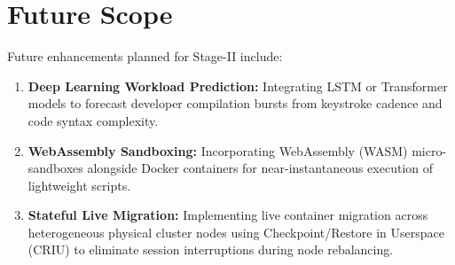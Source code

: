 \documentclass[12pt,a4paper]{report}
\begin{document}
	\section{Future Scope}
	Future enhancements planned for Stage-II include:
	\begin{enumerate}
		\item \textbf{Deep Learning Workload Prediction:} Integrating LSTM or Transformer models to forecast developer compilation bursts from keystroke cadence and code syntax complexity.
		\item \textbf{WebAssembly Sandboxing:} Incorporating WebAssembly (WASM) micro-sandboxes alongside Docker containers for near-instantaneous execution of lightweight scripts.
		\item \textbf{Stateful Live Migration:} Implementing live container migration across heterogeneous physical cluster nodes using Checkpoint/Restore in Userspace (CRIU) to eliminate session interruptions during node rebalancing.
	\end{enumerate}
	
\end{document}
